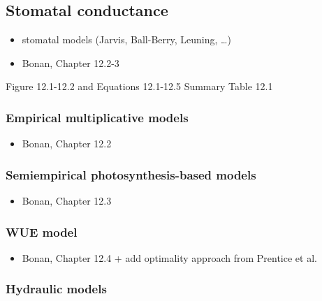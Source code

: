 \documentclass[
  oneside]{book}
\providecommand{\tightlist}{%
  \setlength{\itemsep}{0pt}\setlength{\parskip}{0pt}}
\begin{document}
\hypertarget{stomatal-conductance}{%
\subsection{Stomatal conductance}\label{stomatal-conductance}}

\begin{itemize}
\tightlist
\item
  stomatal models (Jarvis, Ball-Berry, Leuning, \ldots)
\item
  Bonan, Chapter 12.2-3
\end{itemize}

Figure 12.1-12.2 and Equations 12.1-12.5
Summary Table 12.1

\hypertarget{empirical-multiplicative-models}{%
\subsubsection{Empirical multiplicative models}\label{empirical-multiplicative-models}}

\begin{itemize}
\tightlist
\item
  Bonan, Chapter 12.2
\end{itemize}

\hypertarget{semiempirical-photosynthesis-based-models}{%
\subsubsection{Semiempirical photosynthesis-based models}\label{semiempirical-photosynthesis-based-models}}

\begin{itemize}
\tightlist
\item
  Bonan, Chapter 12.3
\end{itemize}

\hypertarget{wue-model}{%
\subsubsection{WUE model}\label{wue-model}}

\begin{itemize}
\tightlist
\item
  Bonan, Chapter 12.4 + add optimality approach from Prentice et al.
\end{itemize}

\hypertarget{hydraulic-models}{%
\subsubsection{Hydraulic models}\label{hydraulic-models}}
\end{document}
